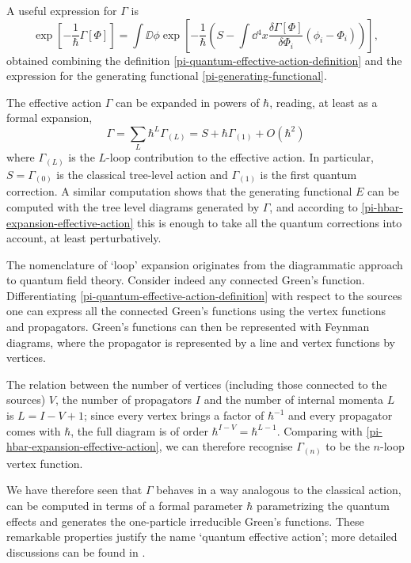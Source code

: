 A useful expression for $\Gamma$ is
\begin{equation}\label{eff-act-scalar}
\exp\left[{- \frac{1}{\hbar}\Gamma[\Phi]}\right] = \int \DD{\phi}  
\exp \left[ -\frac{1}{\hbar} \left( S - \int \dd{^4x}  \frac{\delta \Gamma [\Phi]}{ \delta \Phi_i}  (\phi_i - \Phi_i)  \right) \right],
\end{equation}
obtained combining the definition \eqref{pi-quantum-effective-action-definition} and the expression for the generating functional \eqref{pi-generating-functional}.

The effective action $\Gamma $ can be expanded in powers of $\hbar$, reading, at least as a formal expansion, 
\begin{equation}\label{pi-hbar-expansion-effective-action}
{\Gamma} =  \sum_L \hbar^L \Gamma_{(L)}
=  S + \hbar \Gamma_{(1)} + O\left(\hbar^2\right)
\end{equation}
where $\Gamma_{(L)}$ is the $L$-loop contribution to the effective action. In particular, $S = \Gamma_{(0)}$ is the classical tree-level action and $\Gamma_{(1)}$ is the first quantum correction. A similar computation shows that the generating functional $E$ can be computed with the tree level diagrams generated by $\Gamma$, and according to \eqref{pi-hbar-expansion-effective-action} this is enough to take all the quantum corrections into account, at least perturbatively.

The nomenclature of `loop' expansion originates from the diagrammatic approach to quantum field theory.
Consider indeed any connected Green's function. Differentiating \eqref{pi-quantum-effective-action-definition} with respect to the sources one can express all the connected Green's functions using the vertex functions and propagators.
Green's functions can then be represented with Feynman diagrams, where the propagator is represented by a line and vertex functions by vertices.

 The relation between the number of vertices (including those connected to the sources) $V$, the number of propagators $I$  and the number of internal momenta $L$ is $L = I - V + 1$; since every vertex brings a factor of $\hbar^{-1}$ and every propagator comes with $\hbar$, the full diagram is of order $\hbar^{I-V} = \hbar^{L-1}$. Comparing with \eqref{pi-hbar-expansion-effective-action}, we can therefore recognise $\Gamma_{(n)}$ to be the $n$-loop vertex function.



We have therefore seen that $\Gamma$ behaves in a way analogous to the classical action, can be computed in terms of a formal parameter $\hbar$ parametrizing the quantum effects and generates the one-particle irreducible Green's functions. These remarkable properties justify the name `quantum effective action'; more detailed discussions can be found in \cite{WeinbergII}.

